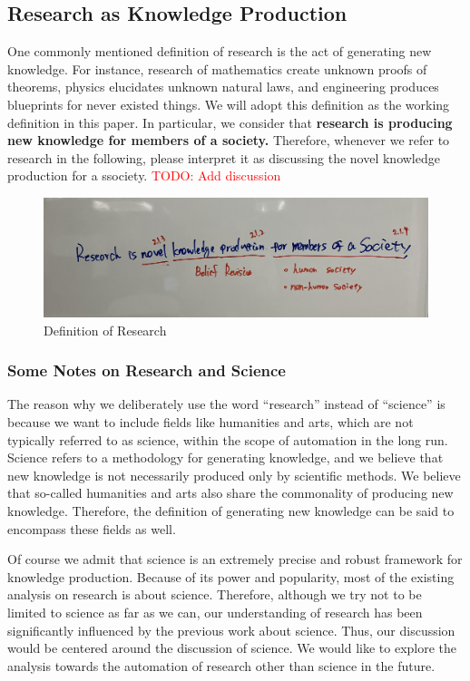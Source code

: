 \documentclass{book}
\begin{document}
\subsection{Research as Knowledge Production}

One commonly mentioned definition of research is the act of generating new knowledge. For instance, research of mathematics create unknown proofs of theorems, physics elucidates unknown natural laws, and engineering produces blueprints for never existed things. We will adopt this definition as the working definition in this paper. In particular, we consider that \textbf{research is producing new knowledge for members of a society.} Therefore, whenever we refer to research in the following, please interpret it as discussing the novel knowledge production for a ssociety. \textcolor{red}{TODO: Add discussion}

\begin{figure}[htb]
    \centering
    \includegraphics[width=\linewidth]{figs/definition.jpg}
    \caption{Definition of Research}
    \label{fig:definition}
\end{figure}


\subsubsection{Some Notes on Research and Science}

The reason why we deliberately use the word ``research'' instead of ``science'' is because we want to include fields like humanities and arts, which are not typically referred to as science, within the scope of automation in the long run. Science refers to a methodology for generating knowledge, and we believe that new knowledge is not necessarily produced only by scientific methods. We believe that so-called humanities and arts also share the commonality of producing new knowledge. Therefore, the definition of generating new knowledge can be said to encompass these fields as well.

Of course we admit that science is an extremely precise and robust  framework for knowledge production. Because of its power and popularity, most of the existing analysis on research is about science. Therefore, although we try not to be limited to science as far as we can, our understanding of research has been significantly influenced by the previous work about science. Thus, our discussion would be centered around the discussion of science. We would like to explore the analysis towards the automation of research other than science in the future.
\end{document}
